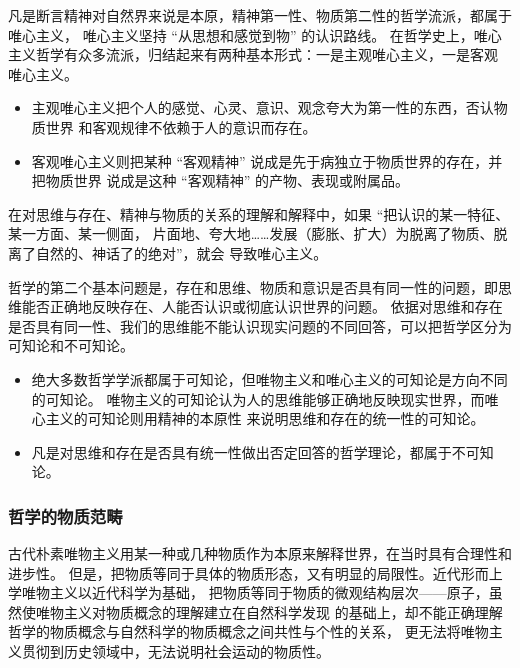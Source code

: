 \documentclass[utf-8, 10pt]{article}
\begin{document}

凡是断言精神对自然界来说是本原，精神第一性、物质第二性的哲学流派，都属于唯心主义，
唯心主义坚持 “从思想和感觉到物” 的认识路线。
在哲学史上，唯心主义哲学有众多流派，归结起来有两种基本形式：一是主观唯心主义，一是客观
唯心主义。
\begin{itemize}[itemsep=0pt]
    \item 主观唯心主义把个人的感觉、心灵、意识、观念夸大为第一性的东西，否认物质世界
    和客观规律不依赖于人的意识而存在。
    \item 客观唯心主义则把某种 “客观精神” 说成是先于病独立于物质世界的存在，并把物质世界
    说成是这种 “客观精神” 的产物、表现或附属品。
\end{itemize}
在对思维与存在、精神与物质的关系的理解和解释中，如果 “把认识的某一特征、某一方面、某一侧面，
片面地、夸大地……发展（膨胀、扩大）为脱离了物质、脱离了自然的、神话了的绝对”，就会
导致唯心主义。

哲学的第二个基本问题是，存在和思维、物质和意识是否具有同一性的问题，即思维能否正确地反映存在、人能否认识或彻底认识世界的问题。
依据对思维和存在是否具有同一性、我们的思维能不能认识现实问题的不同回答，可以把哲学区分为
可知论和不可知论。
\begin{itemize}[itemsep=0pt]
    \item 绝大多数哲学学派都属于可知论，但唯物主义和唯心主义的可知论是方向不同的可知论。
    唯物主义的可知论认为人的思维能够正确地反映现实世界，而唯心主义的可知论则用精神的本原性
    来说明思维和存在的统一性的可知论。
    \item 凡是对思维和存在是否具有统一性做出否定回答的哲学理论，都属于不可知论。
\end{itemize}

\subsubsection{哲学的物质范畴}

古代朴素唯物主义用某一种或几种物质作为本原来解释世界，在当时具有合理性和进步性。
但是，把物质等同于具体的物质形态，又有明显的局限性。近代形而上学唯物主义以近代科学为基础，
把物质等同于物质的微观结构层次——原子，虽然使唯物主义对物质概念的理解建立在自然科学发现
的基础上，却不能正确理解哲学的物质概念与自然科学的物质概念之间共性与个性的关系，
更无法将唯物主义贯彻到历史领域中，无法说明社会运动的物质性。
\end{document}
